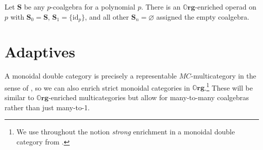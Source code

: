 \documentclass[11pt, one side, article]{memoir}
\theoremstyle{definition}
\theoremstyle{plain}
\newenvironment{example}
  {\pushQED{\qed}\renewcommand{\qedsymbol}{$\lozenge$}\examplex}
  {\popQED\endexamplex}
\newcommand{\Cat}[1]{\mathbf{#1}}%
\newcommand{\id}{\mathrm{id}}
\newcommand{\0}{\textsf{0}}
\newcommand{\1}{\tn{\textsf{1}}}
\newcommand{\org}{{\mathbb{O}\Cat{rg}}}
\renewcommand{\S}{{\Cat{S}}}
\newcommand{\idcoalg}[1]{{\{\id_{#1}\}}}
\begin{document}
\begin{example}
Let $\S$ be any $p$-coalgebra for a polynomial $p$. There is an $\org$-enriched operad on $p$ with $\S_0 = \S$, $\S_1 = \idcoalg{p}$, and all other $\S_n=\varnothing$ assigned the empty coalgebra.
\end{example}



\section{Adaptives}


A monoidal double category is precisely a representable $MC$-multicategory in the sense of \cite{shapiro2022enrichment}, %
so we can also enrich strict monoidal categories in $\org$.\footnote{We use throughout the notion \emph{strong} enrichment in a monoidal double category from \cite{shapiro2022enrichment}.} These will be similar to $\org$-enriched multicategories but allow for many-to-many coalgebras rather than just many-to-1.
\end{document}
